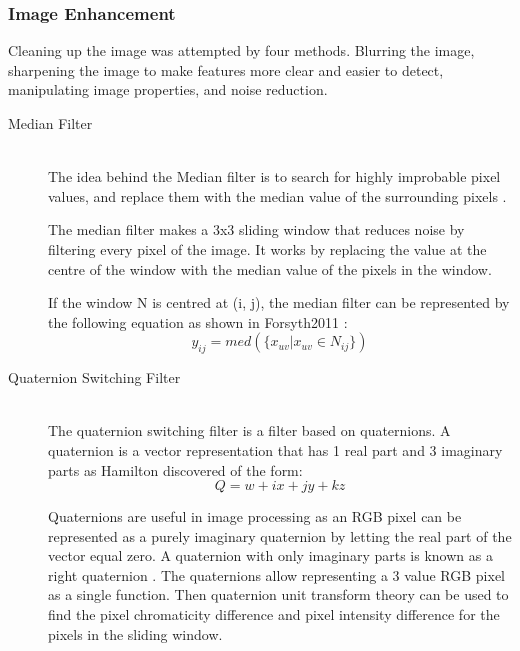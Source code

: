 \subsubsection{Image Enhancement}
Cleaning up the image was attempted by four methods. Blurring the image, sharpening the image to make features more clear and easier to detect, manipulating image properties, and noise reduction. 
\begin{description}
\item[Median Filter]\hfill \\The idea behind the Median filter is to search for highly improbable pixel values, and replace them with the median value of the surrounding pixels \cite{davies2012computer}.

The median filter makes a 3x3 sliding window that reduces noise by filtering every pixel of the image. It works by replacing the value at the centre of the window with the median value of the pixels in the window.

If the window N is centred at (i, j), the median filter can be represented by the following equation as shown in Forsyth2011 \cite{forsyth2011computer}:
\begin{equation}
y_{ij}=med(\lbrace x_{uv}|x_{uv}\in N_{ij} \rbrace)
\end{equation}

\item[Quaternion Switching Filter]\hfill \\
The quaternion switching filter \cite{Geng2012150} is a filter based on quaternions.
A quaternion is a vector representation that has 1 real part and 3 imaginary parts as Hamilton discovered \cite{article:Hamilton1844} of the form:
\begin{equation}
Q=w+ix+jy+kz
\end{equation}

Quaternions are useful in image processing as an RGB pixel can be represented as a purely imaginary quaternion by letting the real part of the vector equal zero. A quaternion with only imaginary parts is known as a right quaternion \cite{article:Hamilton1866}.
The quaternions allow representing a 3 value RGB pixel as a single function. Then quaternion unit transform theory can be used to find the pixel chromaticity difference and pixel intensity difference for the pixels in the sliding window.


\end{description}
